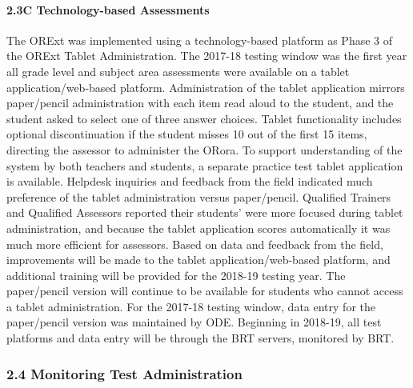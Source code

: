\documentclass[]{article}
\let\oldparagraph\paragraph
\renewcommand{\paragraph}[1]{\oldparagraph{#1}\mbox{}}
\begin{document}
\hypertarget{c-technology-based-assessments}{%
\paragraph{2.3C Technology-based
Assessments}\label{c-technology-based-assessments}}

The ORExt was implemented using a technology-based platform as Phase 3
of the ORExt Tablet Administration. The 2017-18 testing window was the
first year all grade level and subject area assessments were available
on a tablet application/web-based platform. Administration of the tablet
application mirrors paper/pencil administration with each item read
aloud to the student, and the student asked to select one of three
answer choices. Tablet functionality includes optional discontinuation
if the student misses 10 out of the first 15 items, directing the
assessor to administer the ORora. To support understanding of the system
by both teachers and students, a separate practice test tablet
application is available. Helpdesk inquiries and feedback from the field
indicated much preference of the tablet administration versus
paper/pencil. Qualified Trainers and Qualified Assessors reported their
students' were more focused during tablet administration, and because
the tablet application scores automatically it was much more efficient
for assessors. Based on data and feedback from the field, improvements
will be made to the tablet application/web-based platform, and
additional training will be provided for the 2018-19 testing year. The
paper/pencil version will continue to be available for students who
cannot access a tablet administration. For the 2017-18 testing window,
data entry for the paper/pencil version was maintained by ODE. Beginning
in 2018-19, all test platforms and data entry will be through the BRT
servers, monitored by BRT.

\hypertarget{monitoring-test-administration}{%
\subsubsection{2.4 Monitoring Test
Administration}\label{monitoring-test-administration}}
\end{document}

